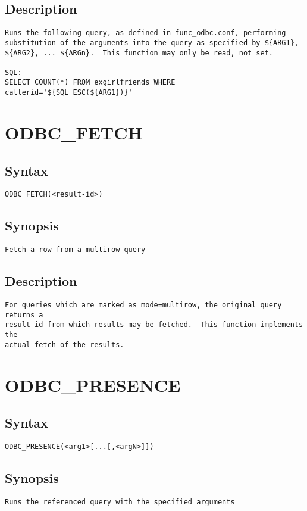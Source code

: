 \subsection{Description}
\begin{verbatim}
Runs the following query, as defined in func_odbc.conf, performing
substitution of the arguments into the query as specified by ${ARG1},
${ARG2}, ... ${ARGn}.  This function may only be read, not set.

SQL:
SELECT COUNT(*) FROM exgirlfriends WHERE callerid='${SQL_ESC(${ARG1})}'

\end{verbatim}


\section{ODBC\_FETCH}
\subsection{Syntax}
\begin{verbatim}
ODBC_FETCH(<result-id>)
\end{verbatim}
\subsection{Synopsis}
\begin{verbatim}
Fetch a row from a multirow query
\end{verbatim}
\subsection{Description}
\begin{verbatim}
For queries which are marked as mode=multirow, the original query returns a
result-id from which results may be fetched.  This function implements the
actual fetch of the results.

\end{verbatim}


\section{ODBC\_PRESENCE}
\subsection{Syntax}
\begin{verbatim}
ODBC_PRESENCE(<arg1>[...[,<argN>]])
\end{verbatim}
\subsection{Synopsis}
\begin{verbatim}
Runs the referenced query with the specified arguments
\end{verbatim}
